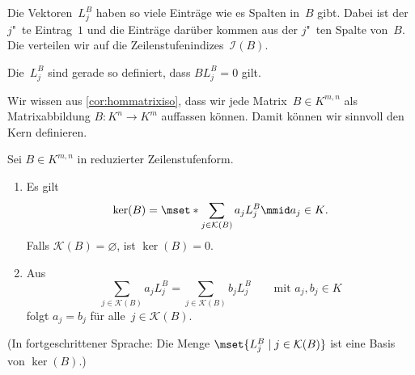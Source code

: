 \documentclass[a4paper]{article}
\begin{document}
Die Vektoren~$L_j^B$ haben so viele Einträge wie es Spalten in~$B$ gibt. Dabei ist der $j$"~te Eintrag~$1$ und die Einträge darüber kommen aus der $j$"~ten Spalte von~$B$. Die verteilen wir auf die Zeilenstufenindizes~$\mathcal{I}(B)$.

\begin{remark}
    Die~$L_j^B$ sind gerade so definiert, dass $BL_j^B = 0$ gilt.
\end{remark}

Wir wissen aus \cref{cor:hommatrixiso}, dass wir jede Matrix~$B \in K^{m,n}$ als Matrixabbildung $B\colon K^n \to K^m$ auffassen können. Damit können wir sinnvoll den Kern definieren.

\begin{theorem}\label{thm:ker:basis}
    Sei $B \in K^{m,n}$ in reduzierter Zeilenstufenform.
    \begin{enumerate}
        \item Es gilt
              \begin{equation*}
                  \ker(B) = \mset*{\sum_{j\in\mathcal{K}(B)} a_jL_j^B \mmid a_j \in K}.
              \end{equation*}
              Falls $\mathcal{K}(B) = \varnothing$, ist $\ker(B) = 0$.
        \item Aus
              \begin{equation*}
                  \sum_{j\in\mathcal{K}(B)} a_jL_j^B = \sum_{j\in\mathcal{K}(B)} b_jL_j^B \qquad\text{mit } a_j,b_j \in K
              \end{equation*}
              folgt $a_j = b_j$ für alle~$j \in \mathcal{K}(B)$.
    \end{enumerate}
    (In fortgeschrittener Sprache: Die Menge $\mset{L_j^B \mid j \in \mathcal{K}(B)}$ ist eine Basis von $\ker(B)$.)
\end{theorem}
\end{document}
